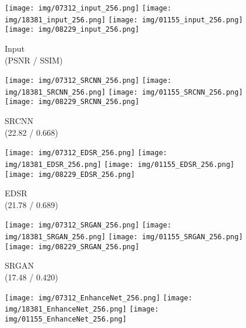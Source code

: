 \documentclass[10pt,twocolumn,letterpaper]{article}
\begin{document}
 \begin{figure*}[t]
\begin{center}
    \begin{subfigure}[b]{\SizeFigCompareLR\textwidth}
        \texttt{[image: img/07312\_input\_256.png]}
        \texttt{[image: img/18381\_input\_256.png]}
        \texttt{[image: img/01155\_input\_256.png]}
        \texttt{[image: img/08229\_input\_256.png]}
        \caption{Input \\ (PSNR / SSIM)}
        \label{fig:input}
    \end{subfigure}
    \begin{subfigure}[b]{\SizeFigCompareLR\textwidth}
        \texttt{[image: img/07312\_SRCNN\_256.png]}
        \texttt{[image: img/18381\_SRCNN\_256.png]}
        \texttt{[image: img/01155\_SRCNN\_256.png]}
        \texttt{[image: img/08229\_SRCNN\_256.png]}
        \caption{SRCNN~\cite{dong2015image} \\ (22.82 / 0.668)}
        \label{fig:SRCNN_256}
    \end{subfigure}
    \begin{subfigure}[b]{\SizeFigCompareLR\textwidth}
        \texttt{[image: img/07312\_EDSR\_256.png]}
        \texttt{[image: img/18381\_EDSR\_256.png]}
        \texttt{[image: img/01155\_EDSR\_256.png]}
        \texttt{[image: img/08229\_EDSR\_256.png]}
        \caption{EDSR~\cite{lim2017enhanced} \\ (21.78 / 0.689)}
        \label{fig:EDSR_256}
    \end{subfigure}
    \begin{subfigure}[b]{\SizeFigCompareLR\textwidth}
        \texttt{[image: img/07312\_SRGAN\_256.png]}
        \texttt{[image: img/18381\_SRGAN\_256.png]}
        \texttt{[image: img/01155\_SRGAN\_256.png]}
        \texttt{[image: img/08229\_SRGAN\_256.png]}
        \caption{SRGAN~\cite{ledig2017photo} \\ (17.48 / 0.420)}
        \label{fig:SRGAN_256}
    \end{subfigure}
    \begin{subfigure}[b]{\SizeFigCompareLR\textwidth}
        \texttt{[image: img/07312\_EnhanceNet\_256.png]}
        \texttt{[image: img/18381\_EnhanceNet\_256.png]}
        \texttt{[image: img/01155\_EnhanceNet\_256.png]}

\end{subfigure}
\end{center}
\end{figure*}
\end{document}
